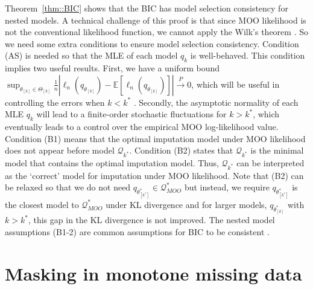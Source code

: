 \documentclass[aos, preprint]{imsart}
\theoremstyle{plain}
\theoremstyle{definition}
\newcommand{\E}{\mbox{$\mathbb{E}$}}
\begin{document}
Theorem~\ref{thm::BIC} shows that the BIC  has model selection consistency for nested models. 
A technical challenge of this proof is that since MOO likelihood is not the conventional likelihood function,
we cannot apply the Wilk's theorem \citep{wilks1938large}. So we need some extra conditions to ensure model selection consistency. 
Condition (AS) is needed so that the MLE of each model $q_k$ is well-behaved.
This condition implies two useful results. First, we have a uniform bound 
$\sup_{\theta_{[k]}\in\Theta_{[k]}}\frac{1}{n}\left|\ell_n(q_{\theta_{[k]}}) - \E[\ell_n(q_{\theta_{[k]}})]\right|\overset{P}{\rightarrow}0$,
which will be useful in controlling the errors when $k<k^*$ .
Secondly, the asymptotic normality of each MLE $q_k$ will lead to a finite-order
stochastic fluctuations for $k>k^*$, which eventually leads to a control over the empirical MOO log-likelihood value. 
Condition (B1) means that the optimal imputation model under MOO likelihood does not 
appear before model $\mathcal{Q}_{k^*}$. Condition (B2) states that $\mathcal{Q}_{k^*}$ is the minimal model 
that contains the optimal imputation model. Thus, $\mathcal{Q}_{k^*}$ can be interpreted as the `correct' model
for imputation under MOO likelihood.
Note that (B2) can be relaxed so that we do not need $q_{\theta^*_{[k^*]}}\in \mathcal{Q}^*_{MOO}$
but instead, we require $q_{\theta^*_{[k^*]}}$ is the closest model to $\mathcal{Q}^*_{MOO}$
under KL divergence
and for larger models, $q_{\theta^*_{[k]}}$ with $k>k^*$,
this gap in the KL divergence is not improved. 
The nested model assumptions (B1-2) are common assumptions for BIC to be consistent \citep{nishii1984asymptotic, yang2005can}.








\section{Masking in monotone missing data}	\label{sec::mono}
\end{document}
